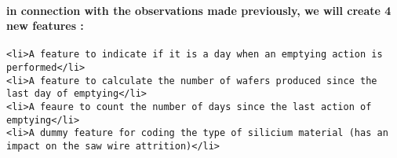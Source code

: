 \documentclass[11pt]{article}
\begin{document}
    \paragraph{in connection with the observations made previously, we will
create 4 new features
:}\label{in-connection-with-the-observations-made-previously-we-will-create-4-new-features}

\begin{verbatim}
<li>A feature to indicate if it is a day when an emptying action is performed</li>
<li>A feature to calculate the number of wafers produced since the last day of emptying</li>
<li>A feaure to count the number of days since the last action of emptying</li>
<li>A dummy feature for coding the type of silicium material (has an impact on the saw wire attrition)</li>
\end{verbatim}
\end{document}
